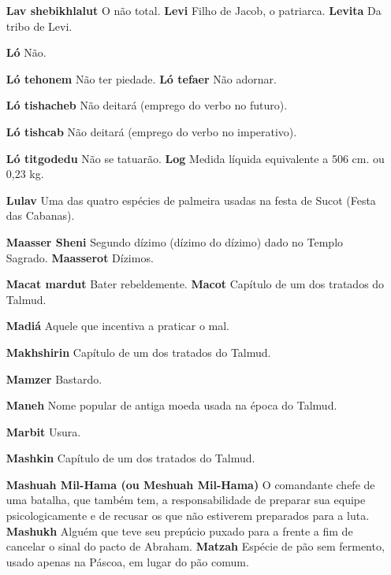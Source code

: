 \begin{itemize}
\item[\textbf{Lav shebikhlalut} O não total. \textbf{Levi}] Filho de Jacob,
o patriarca. \textbf{Levita} Da tribo de Levi.

\item[\textbf{Ló}] Não.

\item[\textbf{Ló tehonem} Não ter piedade. \textbf{Ló tefaer}] Não adornar.

\item[\textbf{Ló tishacheb}] Não deitará (emprego do verbo no futuro).

\item[\textbf{Ló tishcab}] Não deitará (emprego do verbo no imperativo).

\item[\textbf{Ló titgodedu} Não se tatuarão. \textbf{Log}] Medida líquida
equivalente a 506 cm. ou 0,23 kg.

\item[\textbf{Lulav}] Uma das quatro espécies de palmeira usadas na festa de
Sucot (Festa das Cabanas).

\item[\textbf{Maasser Sheni}] Segundo dízimo (dízi­mo do dízimo) dado no
Templo Sagrado. \textbf{Maasserot} Dízimos.

\item[\textbf{Macat mardut} Bater rebeldemente. \textbf{Macot}] Capítulo de
um dos tratados do Talmud.

\item[\textbf{Madiá}] Aquele que incentiva a prati­car o mal.

\item[\textbf{Makhshirin}] Capítulo de um dos tra­tados do Talmud.

\item[\textbf{Mamzer}] Bastardo.

\item[\textbf{Maneh}] Nome popular de antiga moe­da usada na época do Talmud.
\item[\textbf{Marbit}] Usura.

\item[\textbf{Mashkin}] Capítulo de um dos trata­dos do Talmud.

\item[\textbf{Mashuah Mil-Hama (ou Meshuah Mil-Hama)}] O comandante chefe de
uma batalha, que também tem, a res­ponsabilidade de preparar sua equipe
psicologicamente e de recusar os que não estiverem preparados para a
luta. \textbf{Mashukh} Alguém que teve seu pre­púcio puxado para a
frente a fim de cancelar o sinal do pacto de Abraham. \textbf{Matzah}
Espécie de pão sem fermen­to, usado apenas na Páscoa, em lugar do pão
comum.


\end{itemize}
